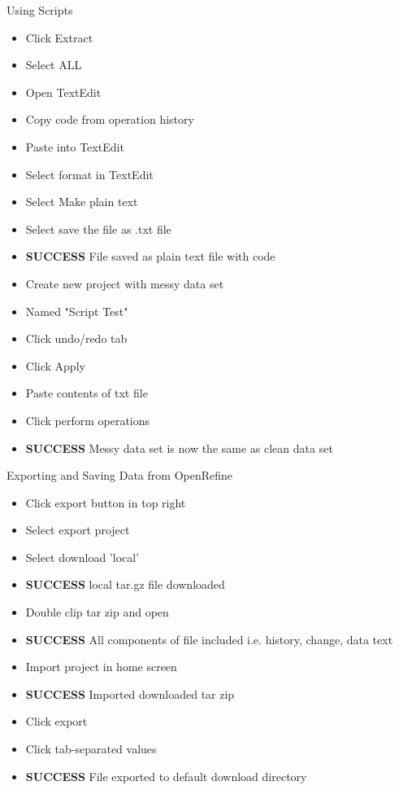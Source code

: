 \documentclass{article}
\begin{document}
Using Scripts
\begin{itemize}
\item Click Extract 
\item Select ALL
\item Open TextEdit
\item Copy code from operation history
\item Paste into TextEdit
\item Select format in TextEdit
\item Select Make plain text
\item Select save the file as .txt file
\item \textbf{SUCCESS} File saved as plain text file with code 
\item Create new project with messy data set
\item Named "Script Test"
\item Click undo/redo tab 
\item Click Apply
\item Paste contents of txt file 
\item Click perform operations
\item \textbf{SUCCESS} Messy data set is now the same as clean data set
\end{itemize}
Exporting and Saving Data from OpenRefine
\begin{itemize}
\item Click export button in top right
\item Select export project
\item Select download 'local'
\item \textbf{SUCCESS} local tar.gz file downloaded
\item Double clip tar zip and open
\item \textbf{SUCCESS} All components of file included i.e. history, change, data text
\item Import project in home screen
\item \textbf{SUCCESS} Imported downloaded tar zip
\item Click export
\item Click tab-separated values
\item \textbf{SUCCESS} File exported to default download directory 
\end{itemize}
\end{document}
